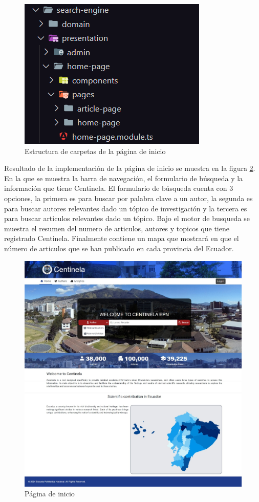 \begin{figure}[H]
    \centering
    \includegraphics[scale=0.8]{../02Figures/02Chapter/Sprints/Sprint-1/home-page-ha.png}
    \caption{Estructura de carpetas de la página de inicio}
    \label{fig:hexagonal-architecture-home}
\end{figure}

Resultado de la implementación de la página de inicio se muestra en la figura \ref{fig:home-page}.
En la que se muestra la barra de navegación, el formulario de búsqueda y la información que tiene Centinela. El formulario de búsqueda cuenta con 3 opciones, 
la primera es para buscar por palabra clave a un autor, la segunda es para buscar autores relevantes dado un tópico de investigación y la tercera es para buscar articulos relevantes dado un tópico.
Bajo el motor de busqueda se muestra el resumen del numero de articulos, autores y topicos que tiene registrado Centinela.
Finalmente contiene un mapa que mostrará en que el número de articulos que se han publicado en cada provincia del Ecuador.
\begin{figure}[H]
    \centering
    \includegraphics[scale=0.160]{../02Figures/02Chapter/Sprints/Sprint-1/home-page.jpeg}
    \caption{Página de inicio}
    \label{fig:home-page}
\end{figure}

